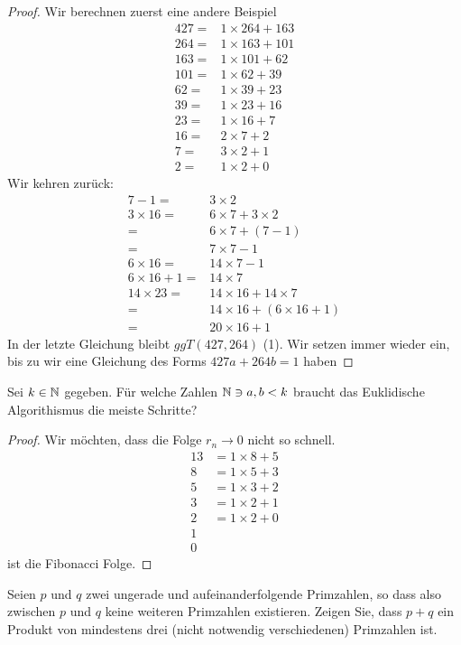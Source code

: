 \begin{proof}
	Wir berechnen zuerst eine andere Beispiel
	\begin{align*}
		427=&1\times 264+163\\
		264=&1\times 163+101\\
		163=&1\times 101+62\\
		101=&1\times 62+39\\
		62=&1\times 39+23\\
		39=&1\times 23+16\\
		23=&1\times 16+7\\
		16=&2\times 7+2\\
		7=&3\times 2+1\\
		2=&1\times 2 +0
	\end{align*}
	Wir kehren zur\"{u}ck:
	\begin{align*}
		7-1=&3\times 2\\
		3\times 16=&6\times 7 +3\times 2\\
		=&6\times 7+(7 - 1)\\
		=&7\times 7-1\\
		6\times 16 =& 14\times 7-1\\
		6\times 16+1=& 14\times 7\\
		14\times 23 =& 14\times 16+14\times 7\\
		=& 14\times 16+(6\times 16+1)\\
		=& 20\times 16 +1
	\end{align*}
	In der letzte Gleichung bleibt $ggT(427,264)$ (1). Wir setzen immer wieder ein, bis zu wir eine Gleichung des Forms $427a+264b=1$ haben
\end{proof}
\begin{Problem}
	Sei $k\in\mathbb{N}$ gegeben. F\"{u}r welche Zahlen $\mathbb{N}\ni a,b<k$ braucht das Euklidische Algorithismus die meiste Schritte?
\end{Problem}
\begin{proof}
Wir möchten, dass die Folge $r_n\to 0$ nicht so schnell. 
	\begin{align*}
		13&=1\times 8+5\\
		8&=1\times 5+3\\
		5&=1\times 3 +2\\
		3&=1\times 2 +1\\
		2&=1\times 2+0\\
		1&\\
		0&
	\end{align*}
	ist die Fibonacci Folge.
\end{proof}
\begin{Problem}
	Seien $p$ und $q$ zwei ungerade und aufeinanderfolgende Primzahlen, so dass also zwischen $p$ und $q$ keine weiteren Primzahlen existieren. Zeigen Sie, dass $p + q$ ein Produkt von mindestens drei (nicht notwendig verschiedenen) Primzahlen ist.
\end{Problem}

